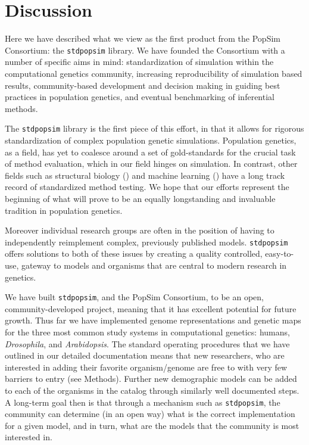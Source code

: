 \documentclass[12pt,halfline,a4paper]{ouparticle}
\newcommand{\stdpopsim}{\texttt{stdpopsim}\xspace}
\begin{document}
\section*{Discussion}

Here we have described what we view as the first product from the PopSim Consortium:
the \stdpopsim library. We have founded the Consortium with a number of specific aims
in mind: standardization of simulation within the computational genetics community,
increasing reproducibility of simulation based results, community-based development and
decision making in guiding best practices in population genetics, and eventual benchmarking
of inferential methods.

The \stdpopsim library is the first piece of this effort, in that it allows for rigorous
standardization of complex population genetic simulations. Population genetics, as a field,
has yet to coalesce around a set of gold-standards for the crucial task of method
evaluation, which in our field hinges on simulation. In contrast, other fields such as
structural biology (\citep{moult1995large}) and machine learning (\citep{russakovsky2015imagenet}) have a long track record
of standardized method testing. We hope that our efforts represent the beginning of what
will prove to be an equally longstanding and invaluable tradition in population genetics.

Moreover individual research groups are often in the position of having to independently
reimplement complex, previously published models. \stdpopsim offers solutions to both of
these issues by creating a quality controlled, easy-to-use, gateway to models and organisms
that are central to modern research in genetics.

We have built \stdpopsim, and the PopSim Consortium, to be an open, community-developed
project, meaning that it has excellent potential for future growth.
Thus far we have implemented genome representations and genetic maps for the three most
common study systems in computational genetics: humans, \emph{Drosophila}, and \emph{Arabidopsis}.
The standard operating procedures that we have outlined in our detailed documentation
means that new researchers, who are interested in adding their favorite organism/genome
are free to with very few barriers to entry (see Methods). Further new demographic models can be added
to each of the organisms in the catalog through similarly well documented steps.
A long-term goal then is that through a mechanism such as \stdpopsim, the community
can determine (in an open way) what is the correct implementation for a given model,
and in turn, what are the models that the community is most interested in.
\end{document}
